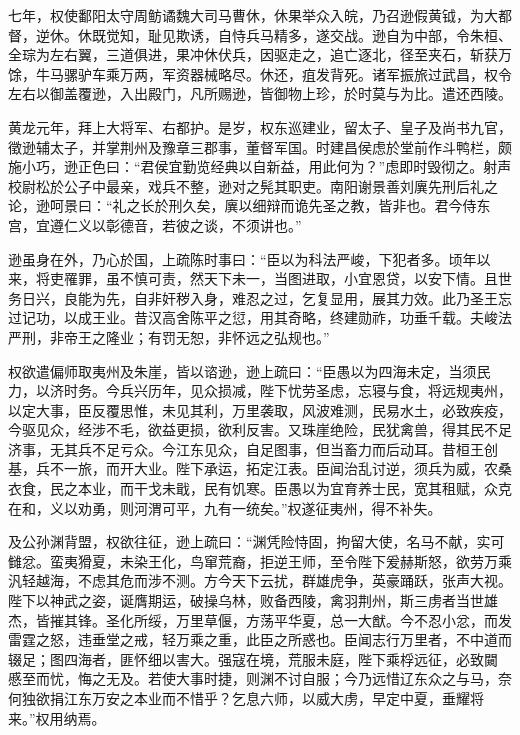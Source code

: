 \documentclass[12pt,UTF8]{ctexbook}
\begin{document}
七年，权使鄱阳太守周鲂谲魏大司马曹休，休果举众入皖，乃召逊假黄钺，为大都督，逆休。休既觉知，耻见欺诱，自恃兵马精多，遂交战。逊自为中部，令朱桓、全琮为左右翼，三道俱进，果冲休伏兵，因驱走之，追亡逐北，径至夹石，斩获万馀，牛马骡驴车乘万两，军资器械略尽。休还，疽发背死。诸军振旅过武昌，权令左右以御盖覆逊，入出殿门，凡所赐逊，皆御物上珍，於时莫与为比。遣还西陵。

黄龙元年，拜上大将军、右都护。是岁，权东巡建业，留太子、皇子及尚书九官，徵逊辅太子，并掌荆州及豫章三郡事，董督军国。时建昌侯虑於堂前作斗鸭栏，颇施小巧，逊正色曰：“君侯宜勤览经典以自新益，用此何为？”虑即时毁彻之。射声校尉松於公子中最亲，戏兵不整，逊对之髡其职吏。南阳谢景善刘廙先刑后礼之论，逊呵景曰：“礼之长於刑久矣，廙以细辩而诡先圣之教，皆非也。君今侍东宫，宜遵仁义以彰德音，若彼之谈，不须讲也。”

逊虽身在外，乃心於国，上疏陈时事曰：“臣以为科法严峻，下犯者多。顷年以来，将吏罹罪，虽不慎可责，然天下未一，当图进取，小宜恩贷，以安下情。且世务日兴，良能为先，自非奸秽入身，难忍之过，乞复显用，展其力效。此乃圣王忘过记功，以成王业。昔汉高舍陈平之愆，用其奇略，终建勋祚，功垂千载。夫峻法严刑，非帝王之隆业；有罚无恕，非怀远之弘规也。”

权欲遣偏师取夷州及朱崖，皆以谘逊，逊上疏曰：“臣愚以为四海未定，当须民力，以济时务。今兵兴历年，见众损减，陛下忧劳圣虑，忘寝与食，将远规夷州，以定大事，臣反覆思惟，未见其利，万里袭取，风波难测，民易水土，必致疾疫，今驱见众，经涉不毛，欲益更损，欲利反害。又珠崖绝险，民犹禽兽，得其民不足济事，无其兵不足亏众。今江东见众，自足图事，但当畜力而后动耳。昔桓王创基，兵不一旅，而开大业。陛下承运，拓定江表。臣闻治乱讨逆，须兵为威，农桑衣食，民之本业，而干戈未戢，民有饥寒。臣愚以为宜育养士民，宽其租赋，众克在和，义以劝勇，则河渭可平，九有一统矣。”权遂征夷州，得不补失。

及公孙渊背盟，权欲往征，逊上疏曰：“渊凭险恃固，拘留大使，名马不献，实可雠忿。蛮夷猾夏，未染王化，鸟窜荒裔，拒逆王师，至令陛下爰赫斯怒，欲劳万乘汎轻越海，不虑其危而涉不测。方今天下云扰，群雄虎争，英豪踊跃，张声大视。陛下以神武之姿，诞膺期运，破操乌林，败备西陵，禽羽荆州，斯三虏者当世雄杰，皆摧其锋。圣化所绥，万里草偃，方荡平华夏，总一大猷。今不忍小忿，而发雷霆之怒，违垂堂之戒，轻万乘之重，此臣之所惑也。臣闻志行万里者，不中道而辍足；图四海者，匪怀细以害大。强寇在境，荒服未庭，陛下乘桴远征，必致闚，慼至而忧，悔之无及。若使大事时捷，则渊不讨自服；今乃远惜辽东众之与马，奈何独欲捐江东万安之本业而不惜乎？乞息六师，以威大虏，早定中夏，垂耀将来。”权用纳焉。
\end{document}
